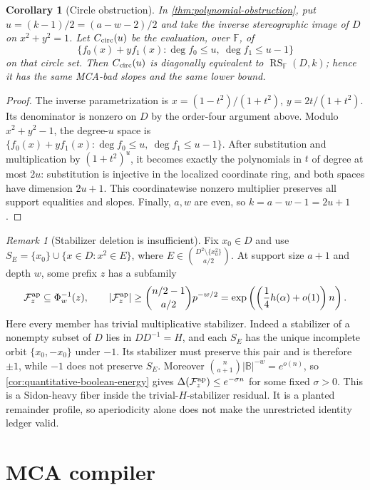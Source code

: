 \documentclass[11pt,a4paper]{amsart}
\numberwithin{equation}{section}
\newtheorem{corollary}[theorem]{Corollary}
\theoremstyle{remark}
\newtheorem{remark}[theorem]{Remark}
\DeclareMathOperator{\RS}{RS}
\newcommand{\F}{\mathbb F}
\newcommand{\B}{\mathbb B}
\begin{document}
\begin{corollary}[Circle obstruction]\label{cor:circle-obstruction}
In \cref{thm:polynomial-obstruction}, put
\(u=(k-1)/2=(a-w-2)/2\) and take the inverse stereographic image of \(D\)
on \(x^2+y^2=1\).  Let \(C_{\rm circ}(u)\) be the evaluation, over
\(\F\), of
\[
 \{f_0(x)+yf_1(x):\deg f_0\le u,\ \deg f_1\le u-1\}
\]
on that circle set.  Then \(C_{\rm circ}(u)\) is diagonally equivalent to
\(\RS_\F(D,k)\); hence it has the same MCA-bad slopes and the same lower
bound.
\end{corollary}

\begin{proof}
The inverse parametrization is
\(x=(1-t^2)/(1+t^2)\), \(y=2t/(1+t^2)\).  Its denominator is nonzero on
\(D\) by the order-four argument above.  Modulo \(x^2+y^2-1\), the
degree-\(u\) space is
\(\{f_0(x)+yf_1(x):\deg f_0\le u,\ \deg f_1\le u-1\}\).  After
substitution and multiplication by \((1+t^2)^u\), it becomes exactly the
polynomials in \(t\) of degree at most \(2u\): substitution is injective
in the localized coordinate ring, and both spaces have dimension
\(2u+1\).  This coordinatewise nonzero multiplier preserves all support
equalities and slopes.  Finally, \(a,w\) are even, so
\(k=a-w-1=2u+1\).
\end{proof}

\begin{remark}[Stabilizer deletion is insufficient]
Fix \(x_0\in D\) and use
\(S_E=\{x_0\}\cup\{x\in D:x^2\in E\}\), where
\(E\in\binom{D^2\setminus\{x_0^2\}}{a/2}\).  At support size \(a+1\)
and depth \(w\), some prefix \(z\) has a subfamily
\[
 \mathcal F_z^{\rm ap}\subseteq\Phi_w^{-1}(z),\qquad
 |\mathcal F_z^{\rm ap}|
 \ge\binom{n/2-1}{a/2}p^{-w/2}
 =\exp\left(\left(\frac14h(\alpha)+o(1)\right)n\right).
\]
Here every member has trivial multiplicative stabilizer.  Indeed a
stabilizer of a nonempty subset of \(D\) lies in
\(DD^{-1}=H\), and each \(S_E\) has the unique incomplete orbit
\(\{x_0,-x_0\}\) under \(-1\).  Its stabilizer must preserve this pair and
is therefore \(\pm1\), while \(-1\) does not preserve \(S_E\).  Moreover
\(\binom n{a+1}|\B|^{-w}=e^{o(n)}\), so
\cref{cor:quantitative-boolean-energy} gives
\(\Delta(\mathcal F_z^{\rm ap})\le e^{-\sigma n}\) for some fixed
\(\sigma>0\).  This is a Sidon-heavy fiber inside the
trivial-\(H\)-stabilizer residual.  It is a planted remainder profile, so
aperiodicity alone does not make the unrestricted identity ledger valid.
\end{remark}

\section{MCA compiler}
\end{document}
